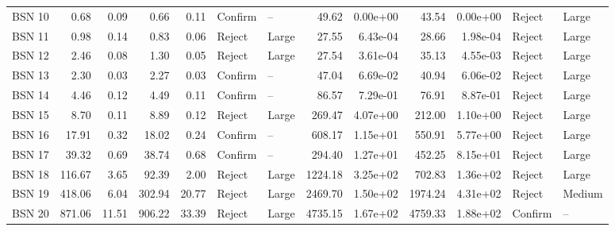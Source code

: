 \begin{tabular}{lrrrrllrrrrll}
 BSN 10 &               0.68 &   0.09 &                0.66 &   0.11 &  Confirm &          -- &                    49.62 &  0.00e+00 &                     43.54 &  0.00e+00 &   Reject &       Large \\
 BSN 11 &               0.98 &   0.14 &                0.83 &   0.06 &   Reject &       Large &                    27.55 &  6.43e-04 &                     28.66 &  1.98e-04 &   Reject &       Large \\
 BSN 12 &               2.46 &   0.08 &                1.30 &   0.05 &   Reject &       Large &                    27.54 &  3.61e-04 &                     35.13 &  4.55e-03 &   Reject &       Large \\
 BSN 13 &               2.30 &   0.03 &                2.27 &   0.03 &  Confirm &          -- &                    47.04 &  6.69e-02 &                     40.94 &  6.06e-02 &   Reject &       Large \\
 BSN 14 &               4.46 &   0.12 &                4.49 &   0.11 &  Confirm &          -- &                    86.57 &  7.29e-01 &                     76.91 &  8.87e-01 &   Reject &       Large \\
 BSN 15 &               8.70 &   0.11 &                8.89 &   0.12 &   Reject &       Large &                   269.47 &  4.07e+00 &                    212.00 &  1.10e+00 &   Reject &       Large \\
 BSN 16 &              17.91 &   0.32 &               18.02 &   0.24 &  Confirm &          -- &                   608.17 &  1.15e+01 &                    550.91 &  5.77e+00 &   Reject &       Large \\
 BSN 17 &              39.32 &   0.69 &               38.74 &   0.68 &  Confirm &          -- &                   294.40 &  1.27e+01 &                    452.25 &  8.15e+01 &   Reject &       Large \\
 BSN 18 &             116.67 &   3.65 &               92.39 &   2.00 &   Reject &       Large &                  1224.18 &  3.25e+02 &                    702.83 &  1.36e+02 &   Reject &       Large \\
 BSN 19 &             418.06 &   6.04 &              302.94 &  20.77 &   Reject &       Large &                  2469.70 &  1.50e+02 &                   1974.24 &  4.31e+02 &   Reject &      Medium \\
 BSN 20 &             871.06 &  11.51 &              906.22 &  33.39 &   Reject &       Large &                  4735.15 &  1.67e+02 &                   4759.33 &  1.88e+02 &  Confirm &          -- \\
\bottomrule
\end{tabular}
